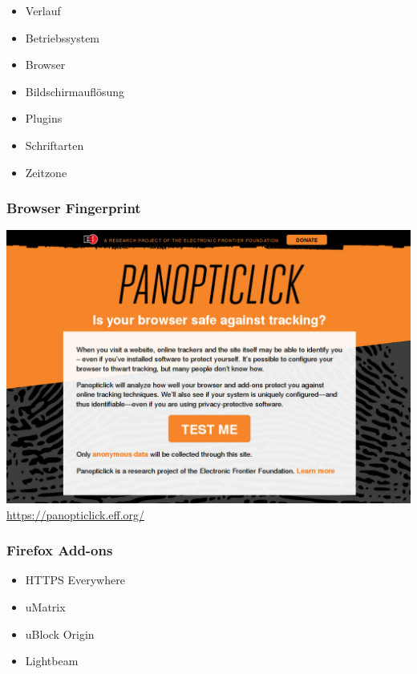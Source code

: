 \documentclass[12pt, table]{beamer}
\begin{document}
\begin{frame}
	\begin{itemize}
		\item Verlauf
	    \item Betriebssystem
    	\item Browser
      	\item Bildschirmauflösung
      	\item Plugins
      	\item Schriftarten
      	\item Zeitzone
	\end{itemize}
\end{frame}

\begin{frame}
	\frametitle{Browser Fingerprint}
	\begin{center}
	    \includegraphics[height=0.7\textheight]{../img/browser_fingerprint.png}
    	\newline
    	\url{https://panopticlick.eff.org/}
    \end{center}
\end{frame}

\begin{frame}
	\frametitle{Firefox Add-ons}
    \begin{itemize}
      	\item HTTPS Everywhere
      	\item uMatrix
      	\item uBlock Origin
      	\item Lightbeam
    \end{itemize}
\end{frame}
\end{document}
